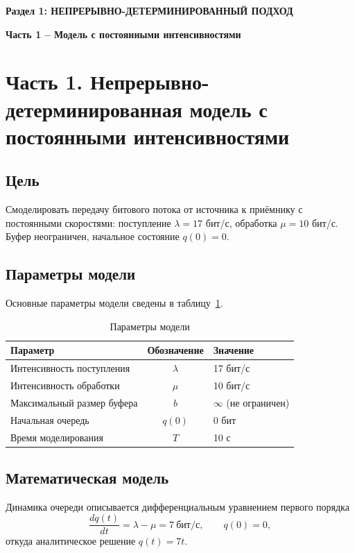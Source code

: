 \documentclass[a4paper,12pt]{article}
\begin{document}
\begin{center}
    {\Large \textbf{Раздел 1: НЕПРЕРЫВНО-ДЕТЕРМИНИРОВАННЫЙ ПОДХОД}}
\end{center}

\vspace{10mm}
\begin{center}
    \textbf{\large Часть 1 -- Модель с постоянными интенсивностями}
\end{center}
\vspace{5mm}

\section*{Часть 1. Непрерывно-детерминированная модель с постоянными интенсивностями}

\subsection*{Цель}
Смоделировать передачу битового потока от источника к приёмнику с постоянными скоростями:
поступление $\lambda = 17$ бит/с, обработка $\mu = 10$ бит/с. Буфер неограничен, начальное
состояние $q(0)=0$.

\subsection*{Параметры модели}
Основные параметры модели сведены в таблицу~\ref{tab:params}.

\begin{table}[h!]
    \centering
    \caption{Параметры модели}
    \label{tab:params}
    \begin{tabular}{|l|c|l|}
        \hline
        Параметр & Обозначение & Значение \\
        \hline
        Интенсивность поступления & $\lambda$ & 17 бит/с \\
        Интенсивность обработки   & $\mu$    & 10 бит/с \\
        Максимальный размер буфера & $b$     & $\infty$ (не ограничен) \\
        Начальная очередь         & $q(0)$  & 0 бит \\
        Время моделирования       & $T$     & 10 с \\
        \hline
    \end{tabular}
\end{table}

\subsection*{Математическая модель}
Динамика очереди описывается дифференциальным уравнением первого порядка
\[
\frac{dq(t)}{dt} = \lambda - \mu = 7\ \text{бит/с}, \qquad q(0)=0,
\]
откуда аналитическое решение $q(t) = 7t$.
\end{document}
